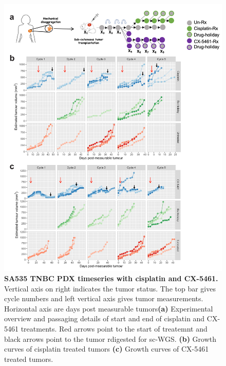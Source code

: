 \begin{figure}
\centering
\includegraphics[width=\textwidth]{Figures/SA535CX5461.pdf}
	
\caption[SA535 TNBC PDX timeseries with cisplatin and CX-5461]
	{\small
 \textbf{SA535 TNBC PDX timeseries with cisplatin and CX-5461.}
	    	Vertical axis on right indicates the tumor status. The top bar gives cycle numbers and left vertical axis gives tumor measurements. Horizontal axis are days post measurable tumors\textbf{(a)} Experimental overview and passaging details of start and end of cisplatin and CX-5461 treatments. Red arrows point to the start of treatemnt and black arrows point to the tumor rdigested for sc-WGS.
	   \textbf{(b)} Growth curves of cisplatin treated tumors
	    \textbf{(c)} Growth curves of CX-5461 treated tumors.
	}
	\label{fig:SA535CX5461}
\end{figure}




